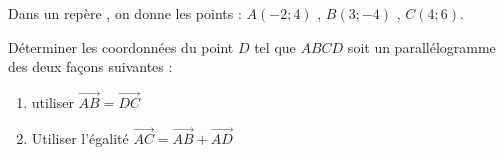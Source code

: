 
Dans un repère \Oij, on donne les points :	$A(-2;4)$ , $B(3;-4)$ , $C(4;6)$.

Déterminer les coordonnées du point $D$ tel que $ABCD$ soit un parallélogramme des deux façons suivantes :
\begin{enumerate}
\item utiliser $\overrightarrow{AB}=\overrightarrow{DC}$
\item Utiliser l'égalité $\overrightarrow{AC}=\overrightarrow{AB}+\overrightarrow{AD}$
\end{enumerate}